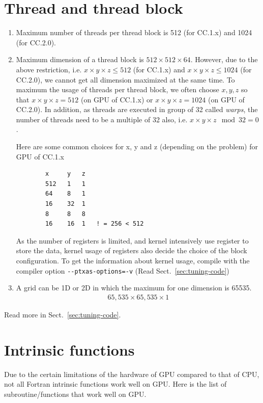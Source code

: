 \section{Thread and thread block}
\label{sec:thread-thread-block}

\begin{enumerate}
\item Maximum number of threads per thread block is 512 (for CC.1.x)
  and 1024 (for CC.2.0).
\item Maximum dimension of a thread block is
  $512\times512\times64$. However, due to the above restriction,
  i.e. $x\times y\times z \le 512$ (for CC.1.x) and $x\times y\times z
  \le 1024$ (for CC.2.0), we cannot get all dimension maximized at the
  same time. To maximum the usage of threads per thread block, we
  often choose $x,y,z$ so that $x\times y\times z = 512$ (on GPU of
  CC.1.x) or $x\times y \times z=1024$ (on GPU of CC.2.0). In
  addition, as threads are executed in group of 32 called {\it warps},
  the number of threads need to be a multiple of 32 also,
  i.e. $x\times y\times z \mod 32 = 0$.

  Here are some common choices for x, y and z (depending on the
  problem) for GPU of CC.1.x
\begin{verbatim}
        x     y   z
        512   1   1
        64    8   1
        16    32  1
        8     8   8
        16    16  1   ! = 256 < 512
\end{verbatim}
  As the number of registers is limited, and kernel intensively use
  register to store the data, kernel usage of registers also decide
  the choice of the block configuration. To get the information about
  kernel usage, compile with the compiler option
  \verb!--ptxas-options=-v!  (Read Sect.~\ref{sec:tuning-code})
\item A grid can be 1D or 2D in which the maximum for one dimension is
  65535.
  \begin{eqnarray}
    \label{eq:99}
    65,535\times 65,535\times 1
  \end{eqnarray}
\end{enumerate}

Read more in Sect.~\ref{sec:tuning-code}.

\section{Intrinsic functions}
\label{sec:intrinsic-functions-2}

Due to the certain limitations of the hardware of GPU compared to that
of CPU, not all Fortran intrinsic functions work well on GPU. Here is
the list of subroutine/functions that work well on GPU.


